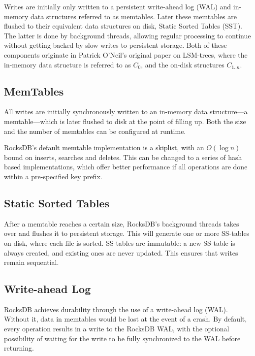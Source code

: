 Writes are initially only written to a persistent write-ahead log (WAL) and
in-memory data structures referred to as memtables. Later these memtables are
flushed to their equivalent data structures on disk, Static Sorted Tables (SST).
The latter is done by background threads, allowing regular processing to
continue without getting backed by slow writes to persistent storage. Both of
these components originate in Patrick O'Neil's original paper on LSM-trees,
where the in-memory data structure is referred to as $ C_0 $, and the on-disk
structures $ C_{1..n} $.


\subsection{MemTables}
All writes are initially synchronously written to an in-memory data structure---a
memtable---which is later flushed to disk at the point of filling up. Both the
size and the number of memtables can be configured at runtime.

RocksDB's default memtable implementation is a skiplist, with an $ O(\log n) $
bound on inserts, searches and deletes. This can be changed to a series of hash
based implementations, which offer better performance if all operations are done
within a pre-specified key prefix.

\subsection{Static Sorted Tables}
After a memtable reaches a certain size, RocksDB's background threads takes over
and flushes it to persistent storage. This will generate one or more SS-tables
on disk, where each file is sorted. SS-tables are immutable: a new SS-table is
always created, and existing ones are never updated. This ensures that writes
remain sequential.

\subsection{Write-ahead Log}
RocksDB achieves durability through the use of a write-ahead log (WAL). Without
it, data in memtables would be lost at the event of a crash. By default, every
 operation results in a write to the RocksDB WAL, with the optional
possibility of waiting for the write to be fully synchronized to the WAL before
returning.

